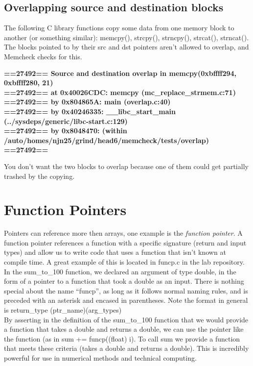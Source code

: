 \documentclass{article}
\begin{document}
\subsection{Overlapping source and destination blocks}
The following C library functions copy some data from one memory block to another (or something similar): memcpy(), strcpy(), strncpy(), strcat(), strncat().
The blocks pointed to by their src and dst pointers aren’t allowed to overlap, and Memcheck checks for this. 
\begin{flushleft}
\textbf{==27492== Source and destination overlap in memcpy(0xbffff294, 0xbffff280, 21) \\ ==27492== \hspace{15} at 0x40026CDC: memcpy (mc\_replace\_strmem.c:71) \\ ==27492== \hspace{15} by 0x804865A: main (overlap.c:40) \\ ==27492== \hspace{15} by 0x40246335: \_\_libc\_start\_main (../sysdeps/generic/libc-start.c:129) \\ ==27492== \hspace{15} by 0x8048470: (within /auto/homes/njn25/grind/head6/memcheck/tests/overlap) \\ ==27492== \hspace{15}}
\end{flushleft}
You don’t want the two blocks to overlap because one of them could get partially trashed by the copying.

\section{Function Pointers}
Pointers can reference more then arrays, one example is the \textit{function pointer}.
A function pointer references a function with a specific signature (return and input types) and allow us to write code that uses a function that isn’t known at compile time.
A great example of this is located in funcp.c in the lab repository. \\
\hspace{15} In the sum\_to\_100 function, we declared an argument of type double, in the form of a pointer to a function that took a double as an input.
There is nothing special about the name ``funcp'', as long as it follows normal naming rules, and is preceded with an asterisk and encased in parentheses.
Note the format in general is return\_type (ptr\_name)(arg\_types)\\
\hspace{15} By asserting in the definition of the sum\_to\_100 function that we would provide a function that takes a double and returns a double, we can use the pointer like the function (as in sum += funcp((float) i).
To call sum we provide a function that meets these criteria (takes a double and returns a double). 
This is incredibly powerful for use in numerical methods and technical computing.
\end{document}

